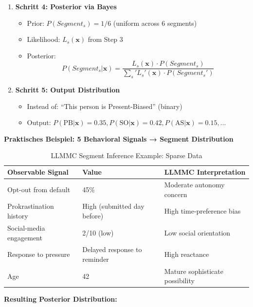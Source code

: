 \begin{enumerate}
\item \textbf{Schritt 4: Posterior via Bayes}
  \begin{itemize}[nosep]
  \item Prior: $P(Segment_s) = 1/6$ (uniform across 6 segments)
  \item Likelihood: $L_s(\mathbf{x})$ from Step 3
  \item Posterior:
    \begin{equation}
    P(Segment_s | \mathbf{x}) = \frac{L_s(\mathbf{x}) \cdot P(Segment_s)}{\sum_s' L_s'(\mathbf{x}) \cdot P(Segment_s')}
    \label{eq:19-posterior-segment}
    \end{equation}
  \end{itemize}

\item \textbf{Schritt 5: Output Distribution}
  \begin{itemize}[nosep]
  \item Instead of: ``This person is Present-Biased'' (binary)
  \item Output: $P(\text{PB}|\mathbf{x})=0.35, P(\text{SO}|\mathbf{x})=0.42, P(\text{AS}|\mathbf{x})=0.15, ...$
  \end{itemize}
\end{enumerate}

\textbf{Praktisches Beispiel: 5 Behavioral Signals → Segment Distribution}

\begin{table}[htbp]
\centering
\caption{LLMMC Segment Inference Example: Sparse Data}
\label{tab:19-llmmc-example}
\renewcommand{\arraystretch}{1.4}
\small
\begin{tabular}{@{}lll@{}}
\toprule
\textbf{Observable Signal} & \textbf{Value} & \textbf{LLMMC Interpretation} \\
\midrule
Opt-out from default & 45\% & Moderate autonomy concern \\
Prokrastination history & High (submitted \textelante{} day before) & High time-preference bias \\
Social-media engagement & 2/10 (low) & Low social orientation \\
Response to pressure & Delayed response to reminder & High reactance \\
Age & 42 & Mature sophisticate possibility \\
\bottomrule
\end{tabular}
\end{table}

\textbf{Resulting Posterior Distribution:}

